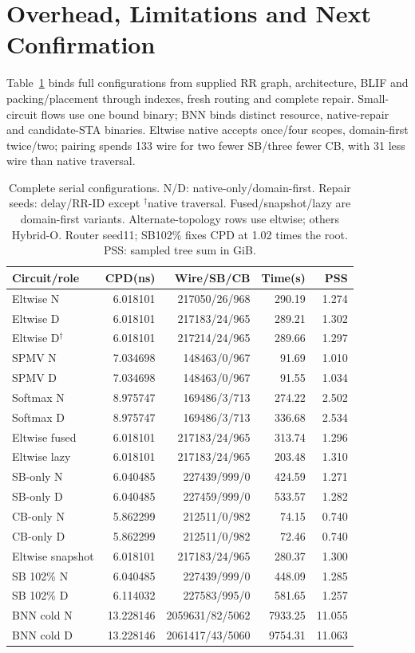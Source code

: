 \documentclass[conference,10pt]{IEEEtran}
\begin{document}
\section{Overhead, Limitations and Next Confirmation}
Table~\ref{tab:completecost} binds full configurations from supplied RR graph, architecture, BLIF and packing/placement through indexes, fresh routing and complete repair. Small-circuit flows use one bound binary; BNN binds distinct resource, native-repair and candidate-STA binaries. Eltwise native accepts once/four scopes, domain-first twice/two; pairing spends 133 wire for two fewer SB/three fewer CB, with 31 less wire than native traversal.
\begin{table}[t]
\centering\footnotesize\setlength{\tabcolsep}{3pt}
\caption{Complete serial configurations. N/D: native-only/domain-first. Repair seeds: delay/RR-ID except $^\dagger$native traversal. Fused/snapshot/lazy are domain-first variants. Alternate-topology rows use eltwise; others Hybrid-O. Router seed11; SB102\% fixes CPD at 1.02 times the root. PSS: sampled tree sum in GiB.}
\label{tab:completecost}
\begin{tabular}{lrrrr}\hline
Circuit/role & CPD(ns) & Wire/SB/CB & Time(s) & PSS\\\hline
Eltwise N&6.018101&217050/26/968&290.19&1.274\\
Eltwise D&6.018101&217183/24/965&289.21&1.302\\
Eltwise D$^\dagger$&6.018101&217214/24/965&289.66&1.297\\
SPMV N&7.034698&148463/0/967&91.69&1.010\\
SPMV D&7.034698&148463/0/967&91.55&1.034\\
Softmax N&8.975747&169486/3/713&274.22&2.502\\
Softmax D&8.975747&169486/3/713&336.68&2.534\\
Eltwise fused&6.018101&217183/24/965&313.74&1.296\\
Eltwise lazy&6.018101&217183/24/965&203.48&1.310\\
SB-only N&6.040485&227439/999/0&424.59&1.271\\
SB-only D&6.040485&227459/999/0&533.57&1.282\\
CB-only N&5.862299&212511/0/982&74.15&0.740\\
CB-only D&5.862299&212511/0/982&72.46&0.740\\
Eltwise snapshot&6.018101&217183/24/965&280.37&1.300\\
SB 102\% N&6.040485&227439/999/0&448.09&1.285\\
SB 102\% D&6.114032&227583/995/0&581.65&1.257\\
BNN cold N&13.228146&2059631/82/5062&7933.25&11.055\\
BNN cold D&13.228146&2061417/43/5060&9754.31&11.063\\\hline
\end{tabular}
\end{table}
\end{document}
